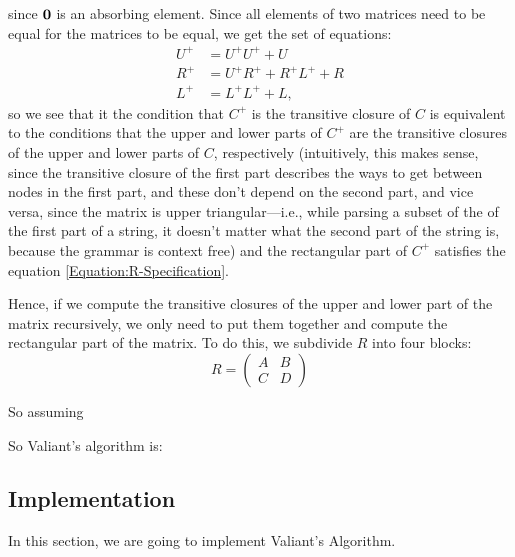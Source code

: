since $\mathbf{0}$ is an absorbing element. Since all elements of two matrices need to be equal for the matrices to be equal, we get the set of equations:
\begin{align}
  U^+ &= U^+U^+ + U \\
  R^+ &= U^+R^+ + R^+L^+ + R \label{Equation:R-Specification}\\
  L^+ &= L^+L^+ + L,
\end{align}
so we see that it the condition that $C^+$ is the transitive closure of $C$ is equivalent to the conditions that the upper and lower parts of $C^+$ are the transitive closures of the upper and lower parts of $C$, respectively (intuitively, this makes sense, since the transitive closure of the first part describes the ways to get between nodes in the first part, and these don't depend on the second part, and vice versa, since the matrix is upper triangular---i.e., while parsing a subset of the of the first part of a string, it doesn't matter what the second part of the string is, because the grammar is context free) and the rectangular part of $C^+$ satisfies the equation \eqref{Equation:R-Specification}.

Hence, if we compute the transitive closures of the upper and lower part of the matrix recursively, we only need to put them together and compute the rectangular part of the matrix.
To do this, we subdivide $R$ into four blocks:
\begin{equation*}
  R =
  \begin{pmatrix}
    A & B \\ 
    C & D
  \end{pmatrix}
\end{equation*}

So assuming 

So Valiant's algorithm is: 

\subsection{Implementation}
In this section, we are going to implement Valiant's Algorithm.
